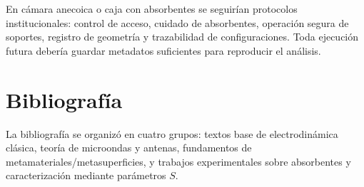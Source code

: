 \documentclass[12pt,a4paper]{article}
\begin{document}
En cámara anecoica o caja con absorbentes se seguirían protocolos institucionales: control de acceso, cuidado de absorbentes, operación segura de soportes, registro de geometría y trazabilidad de configuraciones. Toda ejecución futura debería guardar metadatos suficientes para reproducir el análisis.

\section{Bibliografía}

La bibliografía se organizó en cuatro grupos: textos base de electrodinámica clásica, teoría de microondas y antenas, fundamentos de metamateriales/metasuperficies, y trabajos experimentales sobre absorbentes y caracterización mediante parámetros \(S\).

\begingroup
\renewcommand{\section}[2]{}


\endgroup
\end{document}
